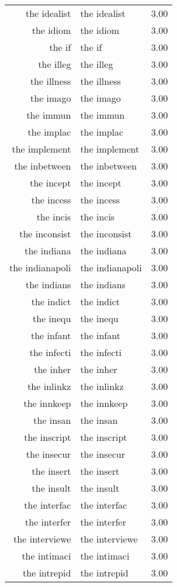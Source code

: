\begin{table}[ht]
\begin{tabular}{rlr}
  the idealist & the idealist & 3.00 \\ 
  the idiom & the idiom & 3.00 \\ 
  the if & the if & 3.00 \\ 
  the illeg & the illeg & 3.00 \\ 
  the illness & the illness & 3.00 \\ 
  the imago & the imago & 3.00 \\ 
  the immun & the immun & 3.00 \\ 
  the implac & the implac & 3.00 \\ 
  the implement & the implement & 3.00 \\ 
  the inbetween & the inbetween & 3.00 \\ 
  the incept & the incept & 3.00 \\ 
  the incess & the incess & 3.00 \\ 
  the incis & the incis & 3.00 \\ 
  the inconsist & the inconsist & 3.00 \\ 
  the indiana & the indiana & 3.00 \\ 
  the indianapoli & the indianapoli & 3.00 \\ 
  the indians & the indians & 3.00 \\ 
  the indict & the indict & 3.00 \\ 
  the inequ & the inequ & 3.00 \\ 
  the infant & the infant & 3.00 \\ 
  the infecti & the infecti & 3.00 \\ 
  the inher & the inher & 3.00 \\ 
  the inlinkz & the inlinkz & 3.00 \\ 
  the innkeep & the innkeep & 3.00 \\ 
  the insan & the insan & 3.00 \\ 
  the inscript & the inscript & 3.00 \\ 
  the insecur & the insecur & 3.00 \\ 
  the insert & the insert & 3.00 \\ 
  the insult & the insult & 3.00 \\ 
  the interfac & the interfac & 3.00 \\ 
  the interfer & the interfer & 3.00 \\ 
  the interviewe & the interviewe & 3.00 \\ 
  the intimaci & the intimaci & 3.00 \\ 
  the intrepid & the intrepid & 3.00 \\ 

\end{tabular}
\end{table}
